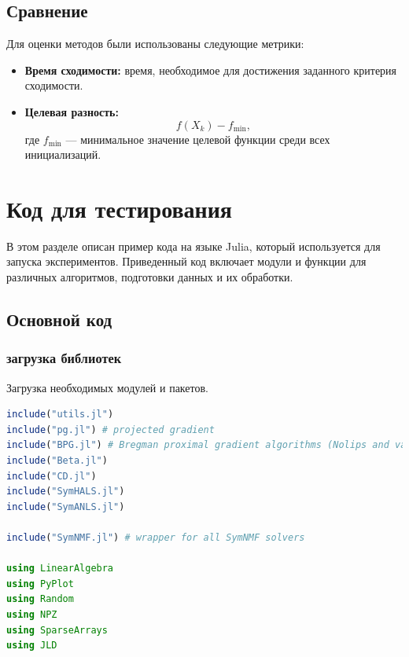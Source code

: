 \documentclass[a4paper,11pt]{article}
\begin{document}
\subsection{Сравнение}

Для оценки методов были использованы следующие метрики:
\begin{itemize}
    \item \textbf{Время сходимости:} время, необходимое для достижения заданного критерия сходимости.
    \item \textbf{Целевая разность:}
    \[
    f(X_k) - f_\text{min},
    \]
    где $f_\text{min}$ — минимальное значение целевой функции среди всех инициализаций.

\end{itemize}

\section{Код для тестирования}
\label{sec:testing-code}
В этом разделе описан пример кода на языке Julia, который используется для запуска экспериментов. 
Приведенный код включает модули и функции для различных алгоритмов, подготовки данных и их обработки.

\subsection{Основной код}
\label{subsec:code-structure}
\subsubsection{загрузка библиотек}
Загрузка необходимых модулей и пакетов.

\begin{lstlisting}[language=julia, caption={загрузка библиотек}, label={lst:example0}]
include("utils.jl")
include("pg.jl") # projected gradient 
include("BPG.jl") # Bregman proximal gradient algorithms (Nolips and variants)
include("Beta.jl")
include("CD.jl")
include("SymHALS.jl")
include("SymANLS.jl")

include("SymNMF.jl") # wrapper for all SymNMF solvers

using LinearAlgebra
using PyPlot
using Random
using NPZ
using SparseArrays
using JLD
\end{lstlisting}
\end{document}
